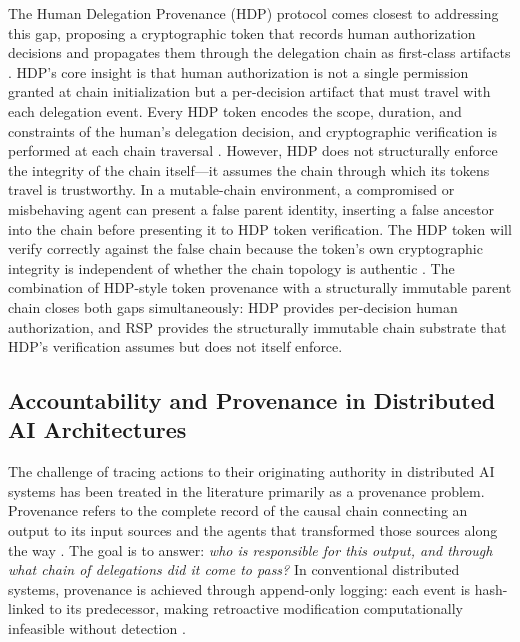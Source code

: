 \documentclass[11pt,oneside]{article}
\begin{document}
The Human Delegation Provenance (HDP) protocol comes closest to addressing this gap, proposing a cryptographic token that records human authorization decisions and propagates them through the delegation chain as first-class artifacts \cite{hdp2025ietf,hdp2025arxiv}. HDP's core insight is that human authorization is not a single permission granted at chain initialization but a per-decision artifact that must travel with each delegation event. Every HDP token encodes the scope, duration, and constraints of the human's delegation decision, and cryptographic verification is performed at each chain traversal \cite{hdp2025ietf}. However, HDP does not structurally enforce the integrity of the chain itself---it assumes the chain through which its tokens travel is trustworthy. In a mutable-chain environment, a compromised or misbehaving agent can present a false parent identity, inserting a false ancestor into the chain before presenting it to HDP token verification. The HDP token will verify correctly against the false chain because the token's own cryptographic integrity is independent of whether the chain topology is authentic \cite{hdp2025arxiv}. The combination of HDP-style token provenance with a structurally immutable parent chain closes both gaps simultaneously: HDP provides per-decision human authorization, and RSP provides the structurally immutable chain substrate that HDP's verification assumes but does not itself enforce.

\subsection{Accountability and Provenance in Distributed AI Architectures}\label{sec:provenance}

The challenge of tracing actions to their originating authority in distributed AI systems has been treated in the literature primarily as a provenance problem. Provenance refers to the complete record of the causal chain connecting an output to its input sources and the agents that transformed those sources along the way \cite{on_chain_provenance_ai}. The goal is to answer: \emph{who is responsible for this output, and through what chain of delegations did it come to pass?} In conventional distributed systems, provenance is achieved through append-only logging: each event is hash-linked to its predecessor, making retroactive modification computationally infeasible without detection \cite{blockchain_ai_governance}.
\end{document}
